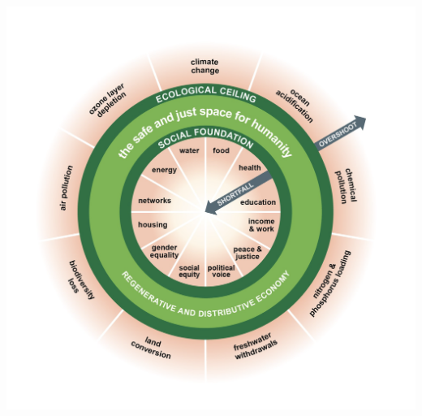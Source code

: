 \documentclass{article}
\begin{document}
\includegraphics[width=\textwidth]{doughnut_economics}

\printbibliography
\end{document}
